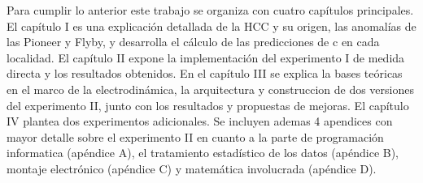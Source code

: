 Para cumplir lo anterior este trabajo se organiza con cuatro capítulos principales. El capítulo I es una explicación detallada de la \ac{HCC} y su origen, las anomalías de las Pioneer y Flyby, y desarrolla el cálculo de las predicciones de c en cada localidad. El capítulo II expone la implementación del experimento I de medida directa y los resultados obtenidos. En el capítulo III se explica la bases teóricas en el marco de la electrodinámica, la arquitectura y construccion de dos versiones del experimento II, junto con los resultados y propuestas de mejoras. El capítulo IV plantea dos experimentos adicionales. Se incluyen ademas 4 apendices con mayor detalle sobre el experimento II en cuanto a la parte de programación informatica (apéndice A), el tratamiento estadístico de los datos (apéndice B), montaje electrónico (apéndice C) y matemática involucrada (apéndice D).



